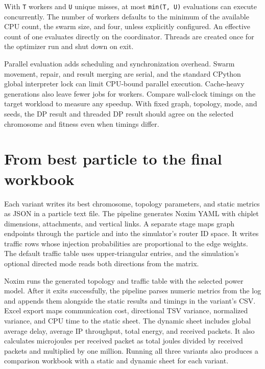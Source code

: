 \documentclass[11pt,a4paper]{article}
\begin{document}
With \texttt{T} workers and \texttt{U} unique misses, at most \texttt{min(T, U)} evaluations can execute concurrently. The number of workers defaults to the minimum of the available CPU count, the swarm size, and four, unless explicitly configured. An effective count of one evaluates directly on the coordinator. Threads are created once for the optimizer run and shut down on exit.

Parallel evaluation adds scheduling and synchronization overhead. Swarm movement, repair, and result merging are serial, and the standard CPython global interpreter lock can limit CPU-bound parallel execution. Cache-heavy generations also leave fewer jobs for workers. Compare wall-clock timings on the target workload to measure any speedup. With fixed graph, topology, mode, and seeds, the DP result and threaded DP result should agree on the selected chromosome and fitness even when timings differ.

\section{From best particle to the final workbook}

Each variant writes its best chromosome, topology parameters, and static metrics as JSON in a particle text file. The pipeline generates Noxim YAML with chiplet dimensions, attachments, and vertical links. A separate stage maps graph endpoints through the particle and into the simulator's router ID space. It writes traffic rows whose injection probabilities are proportional to the edge weights. The default traffic table uses upper-triangular entries, and the simulation's optional directed mode reads both directions from the matrix.

Noxim runs the generated topology and traffic table with the selected power model. After it exits successfully, the pipeline parses numeric metrics from the log and appends them alongside the static results and timings in the variant's CSV. Excel export maps communication cost, directional TSV variance, normalized variance, and CPU time to the static sheet. The dynamic sheet includes global average delay, average IP throughput, total energy, and received packets. It also calculates microjoules per received packet as total joules divided by received packets and multiplied by one million. Running all three variants also produces a comparison workbook with a static and dynamic sheet for each variant.
\end{document}
